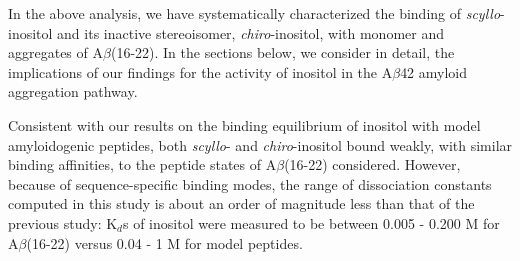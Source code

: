 


\label{sec:discussion}

In the above analysis, we have systematically characterized the binding of \emph{scyllo}-inositol and its inactive stereoisomer, \emph{chiro}-inositol, with monomer and aggregates of A$\beta$(16-22). In the sections below, we consider in detail, the implications of our findings for the activity of inositol in the A$\beta$42 amyloid aggregation pathway.

Consistent with our results on the binding equilibrium of inositol with model amyloidogenic peptides,\cite{Li:2012p853} both \emph{scyllo}- and \emph{chiro}-inositol bound weakly, with similar binding affinities, to the peptide states of A$\beta$(16-22) considered. However, because of sequence-specific binding modes, the range of dissociation constants computed in this study is about an order of magnitude less than that of the previous study: K$_{d}$s of inositol were measured to be between 0.005 - 0.200 M for A$\beta$(16-22) versus 0.04 - 1 M for model peptides.

